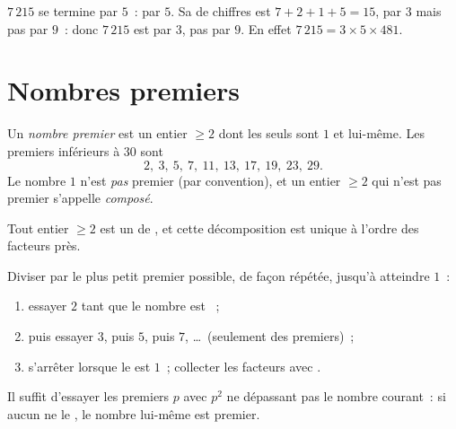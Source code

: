 \begin{example}
$7\,215$ se termine par $5$~:  par $5$. Sa  de chiffres
est $7 + 2 + 1 + 5 = 15$,  par $3$ mais pas par $9$~: donc
$7\,215$ est  par $3$, pas par $9$. En effet
$7\,215 = 3 \times 5 \times 481$.
\end{example}

\section{Nombres premiers}

\begin{definition}\label{def:g9:arith:prime}
Un \emph{nombre premier} est un entier $\geq 2$
dont les seuls  sont $1$ et lui-même. Les premiers inférieurs
à $30$ sont
\[
2,\ 3,\ 5,\ 7,\ 11,\ 13,\ 17,\ 19,\ 23,\ 29 .
\]
Le nombre $1$ n'est \emph{pas} premier (par convention), et un entier
$\geq 2$ qui n'est pas premier s'appelle \emph{composé}.
\end{definition}

\begin{theorem}\label{thm:g9:arith:factorization}
Tout entier $\geq 2$ est un  de , et cette
décomposition est unique à l'ordre des facteurs près.
\end{theorem}
\admitted

\begin{method}\label{met:g9:arith:factorization}
Diviser par le plus petit premier possible, de façon répétée, jusqu'à
atteindre $1$~:
\begin{enumerate}
  \item essayer $2$ tant que le nombre est ~;
  \item puis essayer $3$, puis $5$, puis $7$, \dots\ (seulement des
        premiers)~;
  \item s'arrêter lorsque le  est $1$~; collecter les facteurs
        avec .
\end{enumerate}
Il suffit d'essayer les premiers $p$ avec $p^2$ ne dépassant pas le
nombre courant~: si aucun ne le , le nombre lui-même est premier.
\end{method}

